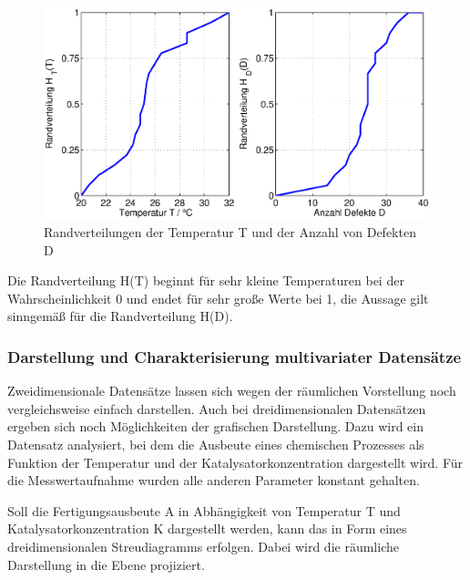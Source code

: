 \noindent 
\begin{figure}[H]
  \centerline{\includegraphics[width=1\textwidth]{Kapitel7/Bilder/image4}}
  \caption{Randverteilungen der Temperatur T und der Anzahl von Defekten D}
  \label{fig:DefekteTemperatur2}
\end{figure}

\noindent Die Randverteilung H(T) beginnt f\"{u}r sehr kleine Temperaturen bei der Wahrscheinlichkeit 0 und endet f\"{u}r sehr gro{\ss}e Werte bei 1, die Aussage gilt sinngem\"{a}{\ss} f\"{u}r die Randverteilung H(D).

\subsubsection{Darstellung und Charakterisierung multivariater Datens\"{a}tze}

\noindent Zweidimensionale Datens\"{a}tze lassen sich wegen der r\"{a}umlichen Vorstellung noch vergleichsweise einfach darstellen. Auch bei dreidimensionalen Datens\"{a}tzen ergeben sich noch M\"{o}glichkeiten der grafischen Darstellung. Dazu wird ein Datensatz analysiert, bei dem die Ausbeute eines chemischen Prozesses als Funktion der Temperatur und der Katalysatorkonzentration dargestellt wird. F\"{u}r die Messwertaufnahme wurden alle anderen Parameter konstant gehalten.\newline

\noindent Soll die Fertigungsausbeute A in Abh\"{a}ngigkeit von Temperatur T und Katalysatorkonzentration K dargestellt werden, kann das in Form eines dreidimensionalen Streudiagramms erfolgen. Dabei wird die r\"{a}umliche Darstellung in die Ebene projiziert.

\clearpage

